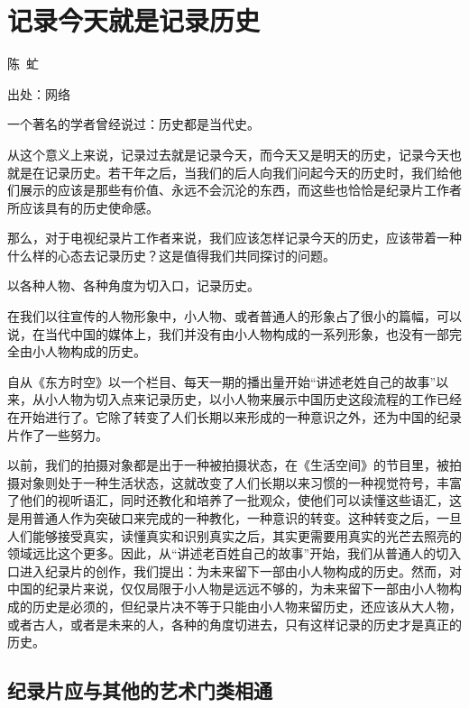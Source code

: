 \chapter{记录今天就是记录历史}


\begin{center} 陈~虻\cite{chengmeng_immortal} \end{center}

出处：网络

一个著名的学者曾经说过：历史都是当代史。

从这个意义上来说，记录过去就是记录今天，而今天又是明天的历史，记录今天也就是在记录历史。若干年之后，当我们的后人向我们问起今天的历史时，我们给他们展示的应该是那些有价值、永远不会沉沦的东西，而这些也恰恰是纪录片工作者所应该具有的历史使命感。

那么，对于电视纪录片工作者来说，我们应该怎样记录今天的历史，应该带着一种什么样的心态去记录历史？这是值得我们共同探讨的问题。

以各种人物、各种角度为切入口，记录历史。

在我们以往宣传的人物形象中，小人物、或者普通人的形象占了很小的篇幅，可以说，在当代中国的媒体上，我们并没有由小人物构成的一系列形象，也没有一部完全由小人物构成的历史。

自从《东方时空》以一个栏目、每天一期的播出量开始“讲述老姓自己的故事”以来，从小人物为切入点来记录历史，以小人物来展示中国历史这段流程的工作已经在开始进行了。它除了转变了人们长期以来形成的一种意识之外，还为中国的纪录片作了一些努力。

以前，我们的拍摄对象都是出于一种被拍摄状态，在《生活空间》的节目里，被拍摄对象则处于一种生活状态，这就改变了人们长期以来习惯的一种视觉符号，丰富了他们的视听语汇，同时还教化和培养了一批观众，使他们可以读懂这些语汇，这是用普通人作为突破口来完成的一种教化，一种意识的转变。这种转变之后，一旦人们能够接受真实，读懂真实和识别真实之后，其实更需要用真实的光芒去照亮的领域远比这个更多。因此，从“讲述老百姓自己的故事”开始，我们从普通人的切入口进入纪录片的创作，我们提出：为未来留下一部由小人物构成的历史。然而，对中国的纪录片来说，仅仅局限于小人物是远远不够的，为未来留下一部由小人物构成的历史是必须的，但纪录片决不等于只能由小人物来留历史，还应该从大人物，或者古人，或者是未来的人，各种的角度切进去，只有这样记录的历史才是真正的历史。

\section{纪录片应与其他的艺术门类相通}


